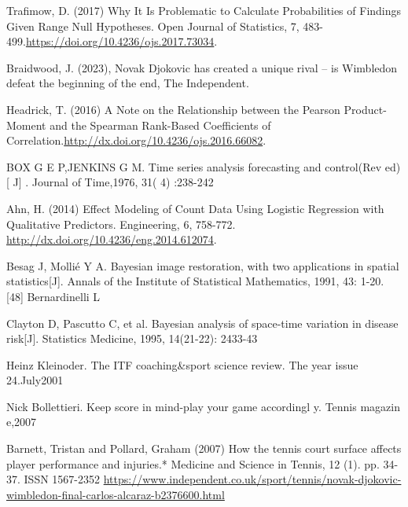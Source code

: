 \documentclass[12pt]{article}
\begin{document}
\newpage

\begin{thebibliography}{99}
	
 Trafimow, D. (2017) Why It Is Problematic to Calculate Probabilities of Findings Given Range Null Hypotheses. Open Journal of Statistics, 7, 483-499.\url{https://doi.org/10.4236/ojs.2017.73034}.	

 Braidwood, J. (2023), Novak Djokovic has created a unique rival – is Wimbledon defeat the beginning of the end, The Independent.

 Headrick, T. (2016) A Note on the Relationship between the Pearson Product-Moment and the Spearman Rank-Based Coefficients of Correlation.\url{http://dx.doi.org/10.4236/ojs.2016.66082}.

BOX G E P,JENKINS G M. Time series analysis forecasting and control(Rev ed) [ J] . Journal of Time,1976, 31( 4) :238-242

 Ahn, H. (2014) Effect Modeling of Count Data Using Logistic Regression with Qualitative Predictors. Engineering, 6, 758-772. \url{http://dx.doi.org/10.4236/eng.2014.612074}.

 Besag J, Mollié Y A. Bayesian image restoration, with two applications in spatial statistics[J]. Annals of the Institute of Statistical Mathematics, 1991, 43: 1-20. [48] Bernardinelli L 

 Clayton D, Pascutto C, et al. Bayesian analysis of space-time variation in disease risk[J]. Statistics Medicine, 1995, 14(21-22): 2433-43

 Heinz Kleinoder. The ITF coaching\&sport science review. The year issue 24.July2001

 Nick Bollettieri. Keep score in mind-play your game accordingl y. Tennis magazin e,2007

 Barnett, Tristan and Pollard, Graham (2007) How the tennis court surface affects player performance and injuries.* Medicine and Science in Tennis, 12 (1). pp. 34-37. ISSN 1567-2352 \url{https://www.independent.co.uk/sport/tennis/novak-djokovic-wimbledon-final-carlos-alcaraz-b2376600.html} 


















\end{thebibliography}
\end{document}
